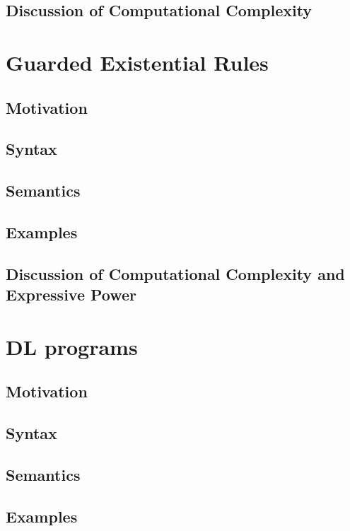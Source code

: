 \documentclass[12pt]{extarticle}
\begin{document}
\subsection{Discussion of Computational Complexity}


\section{Guarded Existential Rules}

\subsection{Motivation}

\subsection{Syntax}

\subsection{Semantics}

\subsection{Examples}

\subsection{Discussion of Computational Complexity and Expressive Power}


\section{DL programs}

\subsection{Motivation}

\subsection{Syntax}

\subsection{Semantics}

\subsection{Examples}
\end{document}
